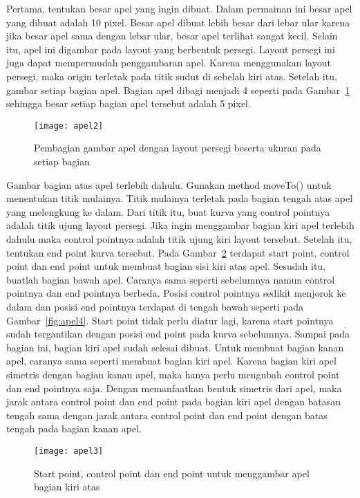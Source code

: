 Pertama, tentukan besar apel yang ingin dibuat. Dalam permainan ini besar apel yang dibuat adalah 10 pixel. Besar apel dibuat lebih besar dari lebar ular karena jika besar apel sama dengan lebar ular, besar apel terlihat sangat kecil. Selain itu, apel ini digambar pada layout yang berbentuk persegi. Layout persegi ini juga dapat mempermudah penggambaran apel. Karena menggunakan layout persegi, maka origin terletak pada titik sudut di sebelah kiri atas. Setelah itu, gambar setiap bagian apel. Bagian apel dibagi menjadi 4 seperti pada Gambar~\ref{fig:apel2} sehingga besar setiap bagian apel tersebut adalah 5 pixel. 

\begin{figure}[H]
	\centering  
	\texttt{[image: apel2]}  
	\caption[Pembagian gambar apel dengan layout persegi beserta ukuran pada setiap bagian]{Pembagian gambar apel dengan layout persegi beserta ukuran pada setiap bagian}
	\label{fig:apel2} 
\end{figure}

Gambar bagian atas apel terlebih dahulu. Gunakan method moveTo() untuk menentukan titik mulainya. Titik mulainya terletak pada bagian tengah atas apel yang melengkung ke dalam. Dari titik itu, buat kurva yang control pointnya adalah titik ujung layout persegi. Jika ingin menggambar bagian kiri apel terlebih dahulu maka control pointnya adalah titik ujung kiri layout tersebut. Setelah itu, tentukan end point kurva tersebut. Pada Gambar~\ref{fig:apel3} terdapat start point, control point dan end point untuk membuat bagian sisi kiri atas apel. Sesudah itu, buatlah bagian bawah apel. Caranya sama seperti sebelumnya namun control pointnya dan end pointnya berbeda. Posisi control pointnya sedikit menjorok ke dalam dan posisi end pointnya terdapat di tengah bawah seperti pada Gambar~\ref{fig:apel4}. Start point tidak perlu diatur lagi, karena start pointnya sudah tergantikan dengan posisi end point pada kurva sebelumnya. Sampai pada bagian ini, bagian kiri apel sudah selesai dibuat. Untuk membuat bagian kanan apel, caranya sama seperti membuat bagian kiri apel. Karena bagian kiri apel simetris dengan bagian kanan apel, maka hanya perlu mengubah control point dan end pointnya saja. Dengan memanfaatkan bentuk simetris dari apel, maka jarak antara control point dan end point pada bagian kiri apel dengan batasan tengah sama dengan jarak antara control point dan end point dengan batas tengah pada bagian kanan apel. 

\begin{figure}[H]
	\centering  
	\texttt{[image: apel3]}  
	\caption[Start point, control point dan end point untuk menggambar apel bagian kiri atas]{Start point, control point dan end point untuk menggambar apel bagian kiri atas}
	\label{fig:apel3} 
\end{figure}

